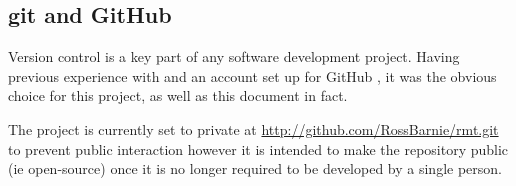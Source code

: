 \subsection{git and GitHub}
Version control is a key part of any software development project.
Having previous experience with and an account set up for GitHub \citeyearpar{github}, it was the obvious choice for this project, as well as this document in fact.

The project is currently set to private at \url{http://github.com/RossBarnie/rmt.git} to prevent public interaction however it is intended to make the repository public (ie open-source) once it is no longer required to be developed by a single person.